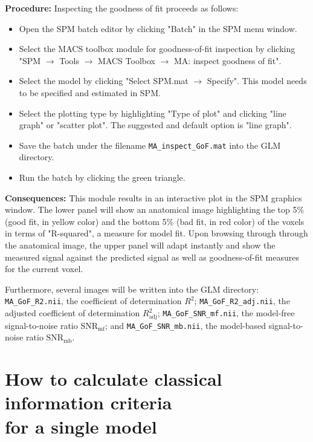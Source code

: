 \documentclass[a4paper,12pt]{article}
\newcommand{\ra}{$\rightarrow$ }
\begin{document}
\textbf{Procedure:} Inspecting the goodness of fit proceeds as follows:
\begin{itemize}
	
\item
Open the SPM batch editor by clicking "Batch" in the SPM menu window.

\item
Select the MACS toolbox module for goodness-of-fit inspection by clicking "SPM \ra Tools \ra MACS Toolbox \ra MA: inspect goodness of fit".

\item
Select the model by clicking "Select SPM.mat \ra Specify". This model needs to be specified and estimated in SPM.

\item
Select the plotting type by highlighting "Type of plot" and clicking "line graph" or "scatter plot". The suggested and default option is "line graph".

\item
Save the batch under the filename \texttt{MA\_inspect\_GoF.mat} into the GLM directory.

\item
Run the batch by clicking the green triangle.

\end{itemize}

\textbf{Consequences:} This module results in an interactive plot in the SPM graphics window. The lower panel will show an anatomical image highlighting the top 5\% (good fit, in yellow color) and the bottom 5\% (bad fit, in red color) of the voxels in terms of "R-squared", a measure for model fit. Upon browsing through through the anatomical image, the upper panel will adapt instantly and show the measured signal against the predicted signal as well as goodness-of-fit measures for the current voxel.

Furthermore, several images will be written into the GLM directory: \texttt{MA\_GoF\_R2.nii}, the coefficient of determination $R^2$; \texttt{MA\_GoF\_R2\_adj.nii}, the adjusted coefficient of determination $R^2_\mathrm{adj}$; \texttt{MA\_GoF\_SNR\_mf.nii}, the model-free signal-to-noise ratio $\mathrm{SNR}_\mathrm{mf}$; and \texttt{MA\_GoF\_SNR\_mb.nii}, the model-based signal-to-noise ratio $\mathrm{SNR}_\mathrm{mb}$.



\pagebreak
\section[How to calculate classical information criteria for a single model]{How to calculate classical information criteria \\ for a single model} \label{sec:ICs}
\end{document}
